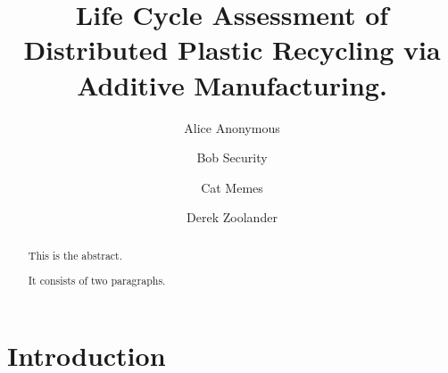 \documentclass[]{elsarticle} %
\begin{document}
\begin{frontmatter}

  \title{Life Cycle Assessment of Distributed Plastic Recycling via Additive Manufacturing.}
    \author[Some Institute of Technology]{Alice Anonymous%
  }
    \author[Another University]{Bob Security}
    \author[Another University]{Cat Memes%
  }
    \author[Some Institute of Technology]{Derek Zoolander%
  }
  
  \begin{abstract}
  This is the abstract.

  It consists of two paragraphs.
  \end{abstract}
  
 \end{frontmatter}

\hypertarget{introduction}{%
\section{Introduction}\label{introduction}}
\end{document}
